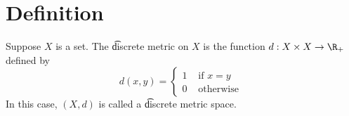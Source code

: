 
\section*{Definition}

Suppose $X$ is a set.
The \t{discrete metric} on $X$ is the function $d: X \times  X \to \R _+$ defined by
\[
d(x, y) = \begin{cases}
1 & \text{ if } x = y \\
0 & \text{ otherwise }
\end{cases}
\]
In this case, $(X, d)$ is called a \t{discrete metric space}.

\blankpage